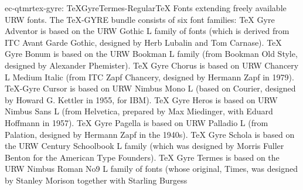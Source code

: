 \documentclass{ddltxtyp}
\begin{document}
\begin{package}{ec-qtmr}{tex-gyre: TeXGyreTermes-Regular}{{\TeX} Fonts extending freely available URW fonts.}
The {\TeX}-GYRE bundle consists of six font families: {\TeX} Gyre
Adventor is based on the URW Gothic L family of fonts (which is
derived from ITC Avant Garde Gothic, designed by Herb Lubalin
and Tom Carnase). {\TeX} Gyre Bonum is based on the URW Bookman L
family (from Bookman Old Style, designed by Alexander
Phemister). {\TeX} Gyre Chorus is based on URW Chancery L Medium
Italic (from ITC Zapf Chancery, designed by Hermann Zapf in
1979). {\TeX}-Gyre Cursor is based on URW Nimbus Mono L (based on
Courier, designed by Howard G. Kettler in 1955, for IBM). {\TeX}
Gyre Heros is based on URW Nimbus Sans L (from Helvetica,
prepared by Max Miedinger, with Eduard Hoffmann in 1957). {\TeX}
Gyre Pagella is based on URW Palladio L (from Palation,
designed by Hermann Zapf in the 1940s). {\TeX} Gyre Schola is
based on the URW Century Schoolbook L family (which was
designed by Morris Fuller Benton for the American Type
Founders). {\TeX} Gyre Termes is based on the URW Nimbus Roman No9
L family of fonts (whose original, Times, was designed by
Stanley Morison together with Starling Burgess %
\end{package}
\end{document}
